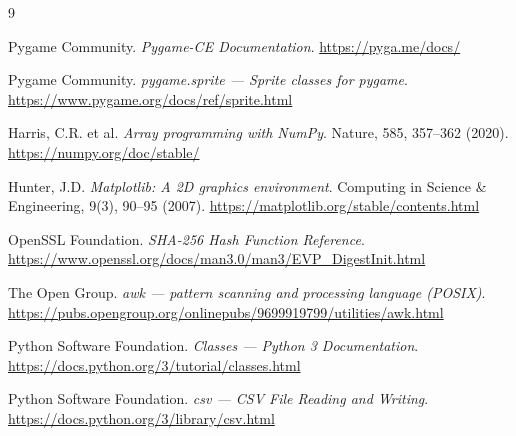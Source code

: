 \documentclass[12pt]{article}
\begin{document}
\begin{thebibliography}{9}

Pygame Community.
\textit{Pygame-CE Documentation}.
\url{https://pyga.me/docs/}

Pygame Community.
\textit{pygame.sprite --- Sprite classes for pygame}.
\url{https://www.pygame.org/docs/ref/sprite.html}

Harris, C.R. et al.
\textit{Array programming with NumPy}.
Nature, 585, 357--362 (2020).
\url{https://numpy.org/doc/stable/}

Hunter, J.D.
\textit{Matplotlib: A 2D graphics environment}.
Computing in Science \& Engineering, 9(3), 90--95 (2007).
\url{https://matplotlib.org/stable/contents.html}

OpenSSL Foundation.
\textit{SHA-256 Hash Function Reference}.
\url{https://www.openssl.org/docs/man3.0/man3/EVP_DigestInit.html}

The Open Group.
\textit{awk --- pattern scanning and processing language (POSIX)}.
\url{https://pubs.opengroup.org/onlinepubs/9699919799/utilities/awk.html}

Python Software Foundation.
\textit{Classes --- Python 3 Documentation}.
\url{https://docs.python.org/3/tutorial/classes.html}

Python Software Foundation.
\textit{csv --- CSV File Reading and Writing}.
\url{https://docs.python.org/3/library/csv.html}

\end{thebibliography}
\end{document}
